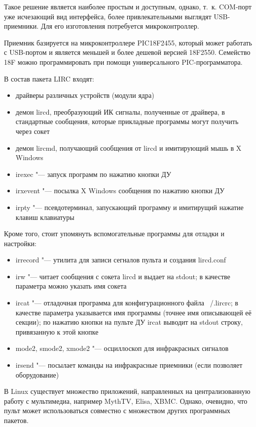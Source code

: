 \documentclass[10pt, a5paper]{article}
\begin{document}
\begin{figure}[ht]
\end{figure}

Такое решение является наиболее простым и доступным, однако, т.~к. COM-порт 
уже исчезающий вид интерфейса, более привлекательными выглядят
USB-приемники. Для его изготовления потребуется микроконтроллер.

Приемник базируется на микроконтроллере PIC18F2455, который может
работать с USB-портом и является меньшей и более дешевой версией
18F2550. Семейство 18F можно программировать при помощи универсального
PIC-программатора.

В состав пакета LIRC входят:
\begin{itemize}
	\item драйверы различных устройств (модули ядра)
	\item демон lircd, преобразующий ИК сигналы, полученные от драйвера, в стандартные сообщения, которые прикладные программы могут получить
через сокет 
\item демон lircmd, получающий сообщения от lircd и имитирующий мышь в X Windows
\item irexec "--- запуск программ по нажатию кнопки ДУ
\item irxevent "--- посылка X Windows сообщения по нажатию кнопки ДУ
\item irpty "--- псевдотерминал, запускающий программу и имитирущий нажатие клавиш клавиатуры
\end{itemize}
Кроме того, стоит упомянуть вспомогательные программы для отладки и настройки:
\begin{itemize}
	\item irrecord "--- утилита для записи сегналов пульта и создания lircd.conf
	\item irw "--- читает сообщения с сокета lircd и выдает на stdout; в качестве параметра можно указать имя сокета
	\item ircat "--- отладочная программа для конфигурационного файла ~/.lircrc; в качестве параметра указывается имя программы (точнее имя описывающей
её секции); по нажатию кнопки на пульте ДУ ircat выводит на stdout строку, привязанную к этой кнопке
\item mode2, smode2, xmode2 "--- осциллоскоп для инфракрасных сигналов
\item irsend "--- посылает команды на инфракрасные приемники (если позволяет оборудование)
\end{itemize}
В Linux существует множество приложений, направленных на централизованную работу с мультимедиа, например MythTV, Elisa,
XBMC. Однако, очевидно, что пульт может использоваться совместно с множеством других программных пакетов.
\end{document}
